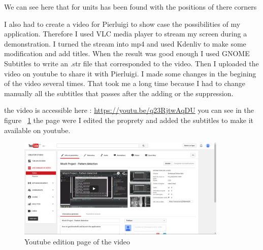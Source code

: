	\par We can see here that for units has been found with the positions of there corners
	
	\par I also had to create a video for Pierluigi to show case the possibilities of my application. Therefore I used VLC media player to stream my screen during a demonstration. I turned the stream into mp4 and used Kdenliv to make some modification and add titles. When the result was good enough I used GNOME Subtitles to write an .str file that corresponded to the video. Then I uploaded the video on youtube to share it with Pierluigi. I made some changes in the begining of the video several times. That took me a long time because I had to change manually all the subtitles that passes after the adding or the suppression.
	\par the video is accessible here : \url{https://youtu.be/q23RjtwAqDU} you can see in the figure ~\ref{video} the page were I edited the proprety and added the subtitles to make it available on youtube.
\begin{figure}[h]
		\begin{center}
			\includegraphics[width=10cm]{images_not_compressed/screenShot.png}
			\caption{Youtube edition page of the video}
			\label{video}	
		\end{center}
	\end{figure}	